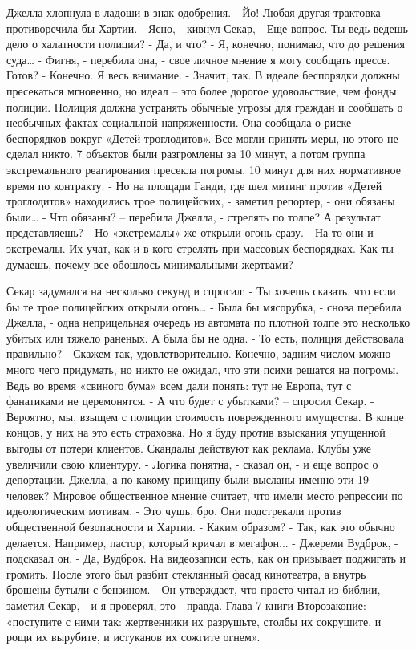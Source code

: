 Джелла хлопнула в ладоши в знак одобрения.
- Йо! Любая другая трактовка противоречила бы Хартии.
- Ясно, - кивнул Секар, - Еще вопрос. Ты ведь ведешь дело о халатности полиции?
- Да, и что?
- Я, конечно, понимаю, что до решения суда…
- Фигня, - перебила она, - свое личное мнение я могу сообщать прессе. Готов?
- Конечно. Я весь внимание.
- Значит, так. В идеале беспорядки должны пресекаться мгновенно, но идеал – это более дорогое удовольствие, чем фонды полиции. Полиция должна устранять обычные угрозы для граждан и сообщать о необычных фактах социальной напряженности. Она сообщала о риске беспорядков вокруг «Детей троглодитов». Все могли принять меры, но этого не сделал никто. 7 объектов были разгромлены за 10 минут, а потом группа экстремального реагирования пресекла погромы. 10 минут для них нормативное время по контракту.
- Но на площади Ганди, где шел митинг против «Детей троглодитов» находились трое полицейских, - заметил репортер, - они обязаны были…
- Что обязаны? – перебила Джелла, - стрелять по толпе? А результат представляешь?
- Но «экстремалы» же открыли огонь сразу.
- На то они и экстремалы. Их учат, как и в кого стрелять при массовых беспорядках. Как ты думаешь, почему все обошлось минимальными жертвами?

Секар задумался на несколько секунд и спросил:
- Ты хочешь сказать, что если бы те трое полицейских открыли огонь…
- Была бы мясорубка, - снова перебила Джелла, - одна неприцельная очередь из автомата по плотной толпе это несколько убитых или тяжело раненых. А была бы не одна.
- То есть, полиция действовала правильно?
- Скажем так, удовлетворительно. Конечно, задним числом можно много чего придумать, но никто не ожидал, что эти психи решатся на погромы. Ведь во время «свиного бума» всем дали понять: тут не Европа, тут с фанатиками не церемонятся.
- А что будет с убытками? – спросил Секар.
- Вероятно, мы, взыщем с полиции стоимость поврежденного имущества. В конце концов, у них на это есть страховка. Но я буду против взыскания упущенной выгоды от потери клиентов. Скандалы действуют как реклама. Клубы уже увеличили свою клиентуру.
- Логика понятна, - сказал он, - и еще вопрос о депортации. Джелла, а по какому принципу были высланы именно эти 19 человек? Мировое общественное мнение считает, что имели место репрессии по идеологическим мотивам.
- Это чушь, бро. Они подстрекали против общественной безопасности и Хартии.
- Каким образом?
- Так, как это обычно делается. Например, пастор, который кричал в мегафон...
- Джереми Вудброк, - подсказал он.
- Да, Вудброк. На видеозаписи есть, как он призывает поджигать и громить. После этого был разбит стеклянный фасад кинотеатра, а внутрь брошены бутыли с бензином.
- Он утверждает, что просто читал из библии, - заметил Секар, - и я проверял, это - правда. Глава 7 книги Второзаконие: «поступите с ними так: жертвенники их разрушьте, столбы их сокрушите, и рощи их вырубите, и истуканов их сожгите огнем».

